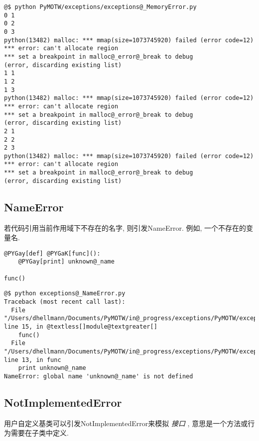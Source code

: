 \documentclass[a4paper,10pt,english]{manual}
\begin{document}
\begin{Verbatim}[commandchars=@\[\]]
@$ python PyMOTW/exceptions/exceptions@_MemoryError.py
0 1
0 2
0 3
python(13482) malloc: *** mmap(size=1073745920) failed (error code=12)
*** error: can't allocate region
*** set a breakpoint in malloc@_error@_break to debug
(error, discarding existing list)
1 1
1 2
1 3
python(13482) malloc: *** mmap(size=1073745920) failed (error code=12)
*** error: can't allocate region
*** set a breakpoint in malloc@_error@_break to debug
(error, discarding existing list)
2 1
2 2
2 3
python(13482) malloc: *** mmap(size=1073745920) failed (error code=12)
*** error: can't allocate region
*** set a breakpoint in malloc@_error@_break to debug
(error, discarding existing list)
\end{Verbatim}


\subsection{NameError}

若代码引用当前作用域下不存在的名字, 则引发NameError. 例如, 一个不存在的变量名.

\begin{Verbatim}[commandchars=@\[\]]
@PYGay[def] @PYGaK[func]():
    @PYGay[print] unknown@_name

func()
\end{Verbatim}

\begin{Verbatim}[commandchars=@\[\]]
@$ python exceptions@_NameError.py
Traceback (most recent call last):
  File "/Users/dhellmann/Documents/PyMOTW/in@_progress/exceptions/PyMOTW/exceptions/exceptions@_NameError.py", line 15, in @textless[]module@textgreater[]
    func()
  File "/Users/dhellmann/Documents/PyMOTW/in@_progress/exceptions/PyMOTW/exceptions/exceptions@_NameError.py", line 13, in func
    print unknown@_name
NameError: global name 'unknown@_name' is not defined
\end{Verbatim}


\subsection{NotImplementedError}

用户自定义基类可以引发NotImplementedError来模拟 \emph{接口} , 意思是一个方法或行为需要在子类中定义.
\end{document}
